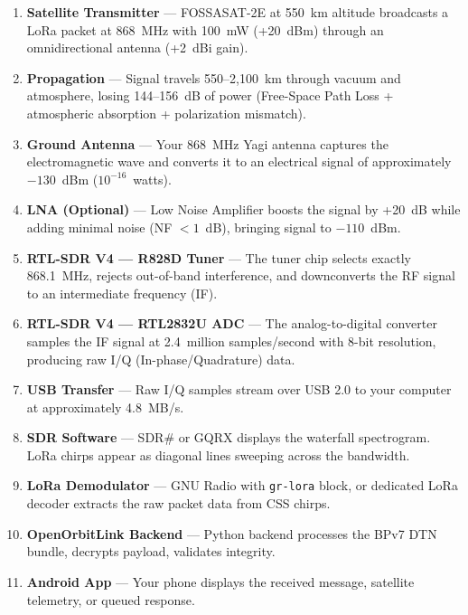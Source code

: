 \documentclass[12pt,a4paper]{article}
\begin{document}
\begin{enumerate}
    \item \textbf{Satellite Transmitter} — FOSSASAT-2E at 550~km altitude broadcasts
          a LoRa packet at 868~MHz with 100~mW (+20~dBm) through an omnidirectional
          antenna (+2~dBi gain).
    
    \item \textbf{Propagation} — Signal travels 550--2,100~km through vacuum and 
          atmosphere, losing 144--156~dB of power (Free-Space Path Loss + atmospheric 
          absorption + polarization mismatch).
    
    \item \textbf{Ground Antenna} — Your 868~MHz Yagi antenna captures the 
          electromagnetic wave and converts it to an electrical signal of approximately 
          $-130$~dBm ($10^{-16}$~watts).
    
    \item \textbf{LNA (Optional)} — Low Noise Amplifier boosts the signal by +20~dB 
          while adding minimal noise (NF $< 1$~dB), bringing signal to $-110$~dBm.
    
    \item \textbf{RTL-SDR V4 — R828D Tuner} — The tuner chip selects exactly 868.1~MHz,
          rejects out-of-band interference, and downconverts the RF signal to an 
          intermediate frequency (IF).
    
    \item \textbf{RTL-SDR V4 — RTL2832U ADC} — The analog-to-digital converter samples 
          the IF signal at 2.4~million samples/second with 8-bit resolution, producing 
          raw I/Q (In-phase/Quadrature) data.
    
    \item \textbf{USB Transfer} — Raw I/Q samples stream over USB 2.0 to your computer 
          at approximately 4.8~MB/s.
    
    \item \textbf{SDR Software} — SDR\# or GQRX displays the waterfall spectrogram.
          LoRa chirps appear as diagonal lines sweeping across the bandwidth.
    
    \item \textbf{LoRa Demodulator} — GNU Radio with \texttt{gr-lora} block, or 
          dedicated LoRa decoder extracts the raw packet data from CSS chirps.
    
    \item \textbf{OpenOrbitLink Backend} — Python backend processes the BPv7 DTN 
          bundle, decrypts payload, validates integrity.
    
    \item \textbf{Android App} — Your phone displays the received message, satellite 
          telemetry, or queued response.
\end{enumerate}
\end{document}
